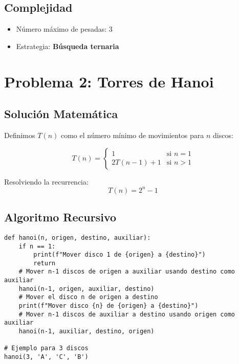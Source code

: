 \documentclass[12pt]{article}
\begin{document}
\subsection*{Complejidad}
\begin{itemize}
    \item Número máximo de pesadas: 3
    \item Estrategia: \textbf{Búsqueda ternaria}
\end{itemize}

\section*{Problema 2: Torres de Hanoi}

\subsection*{Solución Matemática}

Definimos $T(n)$ como el número mínimo de movimientos para $n$ discos:

\[
T(n) = \begin{cases}
1 & \text{si } n = 1 \\
2T(n-1) + 1 & \text{si } n > 1
\end{cases}
\]

Resolviendo la recurrencia:
\[
T(n) = 2^n - 1
\]

\subsection*{Algoritmo Recursivo}

\begin{lstlisting}
def hanoi(n, origen, destino, auxiliar):
    if n == 1:
        print(f"Mover disco 1 de {origen} a {destino}")
        return
    # Mover n-1 discos de origen a auxiliar usando destino como auxiliar
    hanoi(n-1, origen, auxiliar, destino)
    # Mover el disco n de origen a destino
    print(f"Mover disco {n} de {origen} a {destino}")
    # Mover n-1 discos de auxiliar a destino usando origen como auxiliar
    hanoi(n-1, auxiliar, destino, origen)

# Ejemplo para 3 discos
hanoi(3, 'A', 'C', 'B')
\end{lstlisting}
\end{document}
